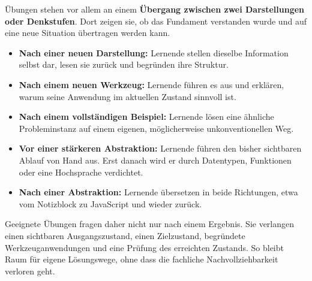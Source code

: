 \documentclass{article}
\begin{document}
        Übungen stehen vor allem an einem \textbf{Übergang zwischen zwei Darstellungen oder Denkstufen}. Dort zeigen sie, ob das Fundament verstanden wurde und auf eine neue Situation übertragen werden kann.

        \begin{itemize}
          \item \textbf{Nach einer neuen Darstellung:} Lernende stellen dieselbe Information selbst dar, lesen sie zurück und begründen ihre Struktur.
          \item \textbf{Nach einem neuen Werkzeug:} Lernende führen es aus und erklären, warum seine Anwendung im aktuellen Zustand sinnvoll ist.
          \item \textbf{Nach einem vollständigen Beispiel:} Lernende lösen eine ähnliche Probleminstanz auf einem eigenen, möglicherweise unkonventionellen Weg.
          \item \textbf{Vor einer stärkeren Abstraktion:} Lernende führen den bisher sichtbaren Ablauf von Hand aus. Erst danach wird er durch Datentypen, Funktionen oder eine Hochsprache verdichtet.
          \item \textbf{Nach einer Abstraktion:} Lernende übersetzen in beide Richtungen, etwa vom Notizblock zu JavaScript und wieder zurück.
        \end{itemize}

        Geeignete Übungen fragen daher nicht nur nach einem Ergebnis. Sie verlangen einen sichtbaren Ausgangszustand, einen Zielzustand, begründete Werkzeuganwendungen und eine Prüfung des erreichten Zustands. So bleibt Raum für eigene Lösungswege, ohne dass die fachliche Nachvollziehbarkeit verloren geht.
      
\end{document}
